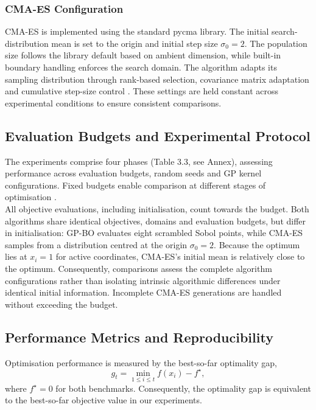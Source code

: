 \documentclass[11pt]{article}
\begin{document}
\subsubsection{CMA-ES Configuration}
CMA-ES is implemented using the standard pycma library. The initial search-distribution mean is set to the origin and initial step size $\sigma_0=2$. The population size follows the library default based on ambient dimension, while built-in boundary handling enforces the search domain. The algorithm adapts its sampling distribution through rank-based selection, covariance matrix adaptation and cumulative step-size control \cite{hansen2023cma}. These settings are held constant across experimental conditions to ensure consistent comparisons.

\subsection{Evaluation Budgets and Experimental Protocol}
The experiments comprise four phases (Table 3.3, see Annex), assessing performance across evaluation budgets, random seeds and GP kernel configurations. Fixed budgets enable comparison at different stages of optimisation \citep{ santoni2024comparison}. \\

\noindent All objective evaluations, including initialisation, count towards the budget. Both algorithms share identical objectives, domains and evaluation budgets, but differ in initialisation: GP-BO evaluates eight scrambled Sobol points, while CMA-ES samples from a distribution centred at the origin $\sigma_0=2$. Because the optimum lies at $x_i=1$ for active coordinates, CMA-ES's initial mean is relatively close to the optimum. Consequently, comparisons assess the complete algorithm configurations rather than isolating intrinsic algorithmic differences under identical initial information. Incomplete CMA-ES generations are handled without exceeding the budget.

\subsection{Performance Metrics and Reproducibility}
Optimisation performance is measured by the best-so-far optimality gap, 
\begin{equation} 
 g_t=\min_{1\le i\le t}f(x_i)-f^\star,
 \end{equation}
 where $f^\star=0$ for both benchmarks. Consequently,
the optimality gap is equivalent to the best-so-far
objective value in our experiments. \\
\end{document}
